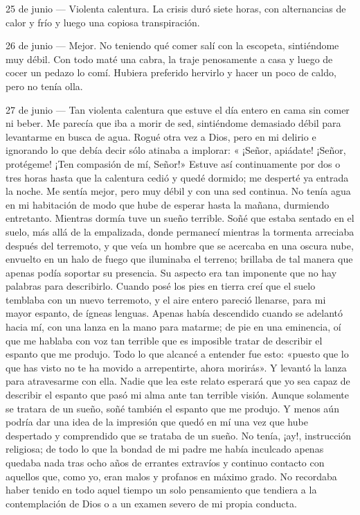 \documentclass{novela}
\begin{document}
    25 de junio — Violenta calentura. La crisis duró siete horas, con alternancias de calor y frío y luego una copiosa transpiración.


    26 de junio — Mejor. No teniendo qué comer salí con la escopeta, sintiéndome muy débil. Con todo maté una cabra, la traje penosamente a casa y luego de cocer un pedazo lo comí. Hubiera preferido hervirlo y hacer un poco de caldo, pero no tenía olla.


    27  de junio — Tan violenta calentura que estuve el día entero en cama sin comer ni beber. Me parecía que iba a morir de sed, sintiéndome demasiado débil para levantarme en busca de agua. Rogué otra vez a Dios, pero en mi delirio e ignorando lo que debía decir sólo atinaba a implorar: « ¡Señor, apiádate! ¡Señor, protégeme! ¡Ten compasión de mí, Señor!» Estuve así continuamente por dos o tres horas hasta que la calentura cedió y quedé dormido; me desperté ya entrada la noche. Me sentía mejor, pero muy débil y con una sed continua. No tenía agua en mi habitación de modo que hube de esperar hasta la mañana, durmiendo entretanto. Mientras dormía tuve un sueño terrible.
    Soñé que estaba sentado en el suelo, más allá de la empalizada, donde permanecí mientras la tormenta arreciaba después del terremoto, y que veía un hombre que se acercaba en una oscura nube, envuelto en un halo de fuego que iluminaba el terreno; brillaba de tal manera que apenas podía soportar su presencia. Su aspecto era tan imponente que no hay palabras para describirlo. Cuando posé los pies en tierra creí que el suelo temblaba con un nuevo terremoto, y el aire entero pareció llenarse, para mi mayor espanto, de ígneas lenguas. Apenas había descendido cuando se adelantó hacia mí, con una lanza en la mano para matarme; de pie en una eminencia, oí que me hablaba con voz tan terrible que es imposible tratar de describir el espanto que me produjo. Todo lo que alcancé a entender fue esto: «puesto que lo que has visto no te ha movido a arrepentirte, ahora morirás». Y levantó la lanza para atravesarme con ella.
    Nadie que lea este relato esperará que yo sea capaz de describir el espanto que pasó mi alma ante tan terrible visión. Aunque solamente se tratara de un sueño, soñé también el espanto que me produjo. Y menos aún podría dar una idea de la impresión que quedó en mí una vez que hube despertado y comprendido que se trataba de un sueño.
    No tenía, ¡ay!, instrucción religiosa; de todo lo que la bondad de mi padre me había inculcado apenas quedaba nada tras ocho años de errantes extravíos y continuo contacto con aquellos que, como yo, eran malos y profanos en máximo grado. No recordaba haber tenido en todo aquel tiempo un solo pensamiento que tendiera a la contemplación de Dios o a un examen severo de mi propia conducta.
\end{document}
